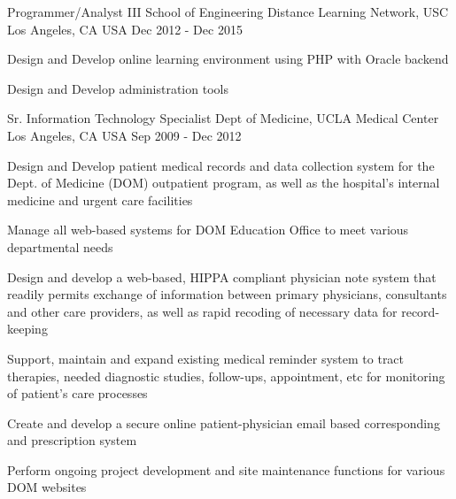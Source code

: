 \begin{cventries}
  \cventry
    {Programmer/Analyst III} %
    {School of Engineering Distance Learning Network, USC} %
    {Los Angeles, CA USA} %
    {Dec 2012 - Dec 2015} %
    {
      \begin{cvitems} %
        \item {Design and Develop online learning environment using PHP with Oracle backend}
        \item {Design and Develop administration tools }       
      \end{cvitems}
    }

  \cventry
    {Sr. Information Technology Specialist} %
    {Dept of Medicine, UCLA Medical Center} %
    {Los Angeles, CA USA} %
    {Sep 2009 - Dec 2012} %
    {
      \begin{cvitems} %
        \item {Design and Develop patient medical records and data collection system for the Dept. of Medicine (DOM) outpatient program, as well as the hospital's internal medicine and urgent care facilities}
        \item {Manage all web-based systems for DOM Education Office to meet various departmental needs}      
		 \item {Design and develop a web-based, HIPPA compliant physician note system that readily permits exchange of information between primary physicians, consultants and other care providers, as well as rapid recoding of necessary data for record-keeping} 
		 \item{Support, maintain and expand existing medical reminder system to tract therapies, needed diagnostic studies, follow-ups, appointment, etc for monitoring of patient's care processes}  
		 \item{Create and develop a secure online patient-physician email based corresponding and prescription system}
		 \item{Perform ongoing project development and site maintenance functions for various DOM websites}
      \end{cvitems}
    }


\end{cventries}
